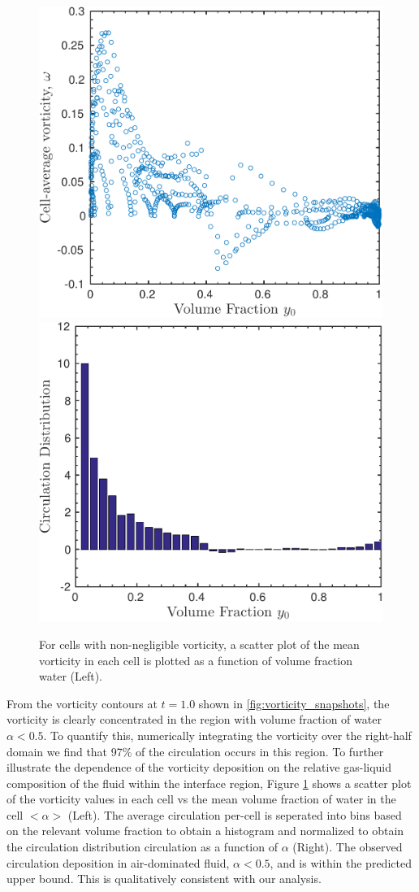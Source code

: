 \documentclass{article}
\begin{document}
\begin{figure}[h]
  \centering
  \includegraphics[width=.48\textwidth]{./figs/lung_figs/vorticity_vs_y0} \hfill
  \includegraphics[width=.48\textwidth]{./figs/lung_figs/circ_y0_dist2}
  \caption{For cells with non-negligible vorticity, a scatter plot of the mean vorticity in each cell is plotted as a function of volume fraction water (Left).  }
  \label{fig:baroclinic_y0_distribution}  
\end{figure}

From the vorticity contours at $t=1.0$ shown in
\ref{fig:vorticity_snapshots}, the vorticity is clearly concentrated
in the region with volume fraction of water $\alpha<0.5$. To quantify
this, numerically integrating the vorticity over the right-half domain
we find that 97\% of the circulation occurs in this region. To further
illustrate the dependence of the vorticity deposition on the relative
gas-liquid composition of the fluid within the interface region,
Figure \ref{fig:baroclinic_y0_distribution} shows a scatter plot of
the vorticity values in each cell vs the mean volume fraction of water
in the cell $<\alpha>$ (Left). The average circulation per-cell is
seperated into bins based on the relevant volume fraction to obtain a
histogram and normalized to obtain the circulation distribution
circulation as a function of $\alpha$ (Right). The observed circulation
deposition in air-dominated fluid, $\alpha<0.5$, and is within the
predicted upper bound. This is qualitatively consistent with our
analysis.
% 
% 
\end{document}
